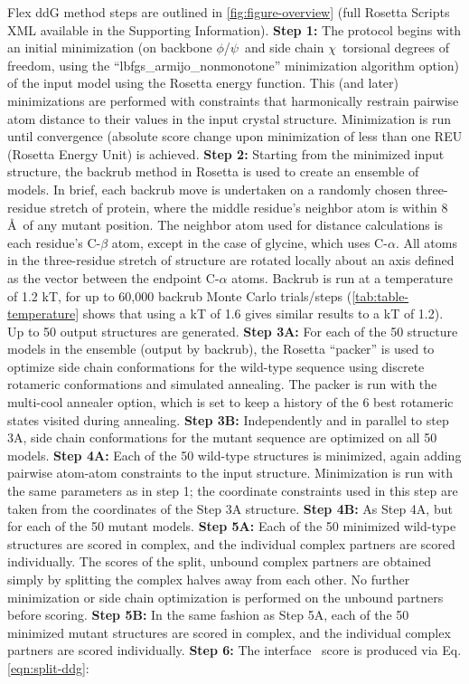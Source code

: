 Flex ddG method steps are outlined in \cref{fig:figure-overview} (full Rosetta Scripts XML available in the Supporting Information).
\textbf{Step 1:} The protocol begins with an initial minimization (on backbone $\phi$/$\psi$\ and side chain $\chi$\ torsional degrees of freedom, using the ``lbfgs\_armijo\_nonmonotone'' minimization algorithm option) of the input model using the Rosetta energy function. This (and later) minimizations are performed with constraints that harmonically restrain pairwise atom distance to their values in the input crystal structure. Minimization is run until convergence (absolute score change upon minimization of less than one REU (Rosetta Energy Unit) is achieved.
\textbf{Step 2:} Starting from the minimized input structure, the backrub method in Rosetta is used to create an ensemble of models. In brief, each backrub move is undertaken on a randomly chosen three-residue stretch of protein, where the middle residue's neighbor atom is within 8 \AA\ of any mutant position. The neighbor atom used for distance calculations is each residue's C-$\beta$ atom, except in the case of glycine, which uses C-$\alpha$. All atoms in the three-residue stretch of structure are rotated locally about an axis defined as the vector between the endpoint C-$\alpha$ atoms. Backrub is run at a temperature of 1.2 kT, for up to 60,000 backrub Monte Carlo trials/steps (\cref{tab:table-temperature} shows that using a kT of 1.6 gives similar results to a kT of 1.2). Up to 50 output structures are generated.
\textbf{Step 3A:} For each of the 50 structure models in the ensemble (output by backrub), the Rosetta ``packer'' is used to optimize side chain conformations for the wild-type sequence using discrete rotameric conformations \cite{shapovalov_smoothed_2011} and simulated annealing. The packer is run with the multi-cool annealer option\cite{leaver-fay_generic_2011}, which is set to keep a history of the 6 best rotameric states visited during annealing.
\textbf{Step 3B:} Independently and in parallel to step 3A, side chain conformations for the mutant sequence are optimized on all 50 models.
\textbf{Step 4A:} Each of the 50 wild-type structures is minimized, again adding pairwise atom-atom constraints to the input structure. Minimization is run with the same parameters as in step 1; the coordinate constraints used in this step are taken from the coordinates of the Step 3A structure.
\textbf{Step 4B:} As Step 4A, but for each of the 50 mutant models.
\textbf{Step 5A:} Each of the 50 minimized wild-type structures are scored in complex, and the individual complex partners are scored individually. The scores of the split, unbound complex partners are obtained simply by splitting the complex halves away from each other. No further minimization or side chain optimization is performed on the unbound partners before scoring.
\textbf{Step 5B:} In the same fashion as Step 5A, each of the 50 minimized mutant structures are scored in complex, and the individual complex partners are scored individually.
\textbf{Step 6:} The interface \ddg\ score is produced via Eq. \ref{eqn:split-ddg}:

